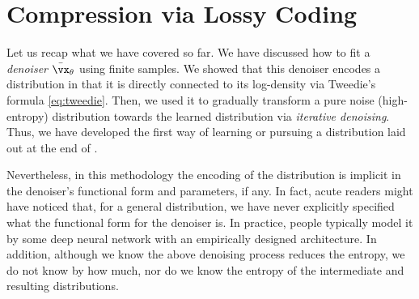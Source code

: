 \documentclass[../../book-main.tex]{subfiles}
\begin{document}





\section{Compression via Lossy Coding} \label{sec:lossy_compression}

Let us recap what we have covered so far. We have discussed how to fit a \textit{denoiser} \(\bar{\vx}_{\theta}\) using finite samples. We showed that this denoiser encodes a distribution in that it is directly connected to its log-density via Tweedie's formula \eqref{eq:tweedie}. Then, we used it to gradually transform a pure noise (high-entropy) distribution towards the learned distribution via \textit{iterative denoising}. Thus, we have developed the first way of learning or pursuing a distribution laid out at the end of .

Nevertheless, in this methodology the encoding of the distribution is implicit in the denoiser's functional form and parameters, if any. In fact, acute readers might have noticed that, for a general distribution, we have never explicitly specified what the functional form for the denoiser is. In practice, people typically model it by some deep neural network with an empirically designed architecture. In addition, although we know the above denoising process reduces the entropy, we do not know by how much,  nor do we know the entropy of the intermediate and resulting distributions. 
\end{document}
